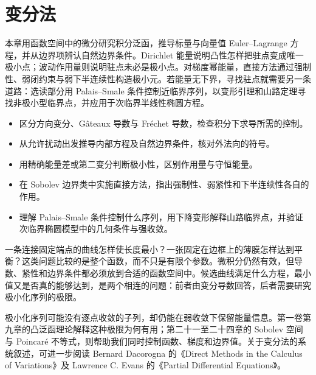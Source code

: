 \chapter{变分法}
\label{b2:ch:14}
\begin{chapterabstract}
本章用函数空间中的微分研究积分泛函，推导标量与向量值 Euler--Lagrange 方程，并从边界项辨认自然边界条件。Dirichlet 能量说明凸性怎样把驻点变成唯一极小点；波动作用量则说明驻点未必是极小点。对梯度幂能量，直接方法通过强制性、弱闭约束与弱下半连续性构造极小元。若能量无下界，寻找驻点就需要另一条道路：选读部分用 Palais--Smale 条件控制近临界序列，以变形引理和山路定理寻找非极小型临界点，并应用于次临界半线性椭圆方程。
\end{chapterabstract}

\begin{learninggoals}
\begin{itemize}
\item\label{b2:item:14-goal-derivative}区分方向变分、Gâteaux 导数与 Fréchet 导数，检查积分下求导所需的控制。
\item\label{b2:item:14-goal-boundary}从允许扰动出发推导内部方程及自然边界条件，核对外法向的符号。
\item\label{b2:item:14-goal-energy}用精确能量差或第二变分判断极小性，区别作用量与守恒能量。
\item\label{b2:item:14-goal-direct}在 Sobolev 边界类中实施直接方法，指出强制性、弱紧性和下半连续性各自的作用。
\item\label{b2:item:14-goal-mountain}理解 Palais--Smale 条件控制什么序列，用下降变形解释山路临界点，并验证次临界椭圆模型中的几何条件与强收敛。
\end{itemize}
\end{learninggoals}

一条连接固定端点的曲线怎样使长度最小？一张固定在边框上的薄膜怎样达到平衡？这类问题比较的是整个函数，而不只是有限个参数。微积分仍然有效，但导数、紧性和边界条件都必须放到合适的函数空间中。候选曲线满足什么方程，最小值又是否真的能够达到，是两个相连的问题：前者由变分导数回答，后者需要研究极小化序列的极限。

\ProseParagraphBreak

极小化序列可能没有逐点收敛的子列，却仍能在弱收敛下保留能量信息。第一卷第九章的凸泛函理论解释这种极限为何有用；第二十一至二十四章的 Sobolev 空间与 Poincaré 不等式，则帮助我们同时控制函数、梯度和边界值。关于变分法的系统叙述，可进一步阅读 Bernard Dacorogna 的《Direct Methods in the Calculus of Variations》\cite{Dacorogna2008Direct}及 Lawrence C. Evans 的《Partial Differential Equations》\cite{Evans2010Partial}。

